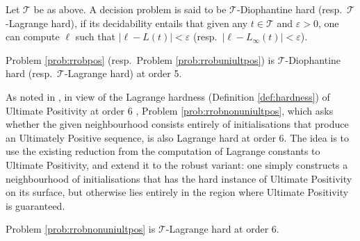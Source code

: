 \begin{definition}
\label{def:hardness}
Let $\mathcal{T}$ be as above. A decision problem is said to be $\mathcal{T}$-Diophantine hard (resp.\ $\mathcal{T}$-Lagrange hard), if its decidability entails that given any $t \in \mathcal{T}$ and $\varepsilon > 0$, one can compute $\ell$ such that $|\ell - L(t)| < \varepsilon$ (resp.\  $|\ell - L_\infty(t)| < \varepsilon$).
\end{definition}

\begin{theorem}
\label{thm:hardness}
Problem \ref{prob:rrobpos} (resp.\ Problem \ref{prob:rrobuniultpos}) is $\mathcal{T}$-Diophantine hard (resp.\ $\mathcal{T}$-Lagrange hard) at order 5. 
\end{theorem}

As noted in \cite{originalarxiv}, in view of the Lagrange hardness (Definition \ref{def:hardness}) of Ultimate Positivity at order 6 \cite{joeljames3}, Problem \ref{prob:rrobnonuniultpos}, which asks whether the given neighbourhood consists entirely of initialisations that produce an Ultimately Positive sequence, is also Lagrange hard at order 6. The idea is to use the existing reduction from the computation of Lagrange constants to Ultimate Positivity, and extend it to the robust variant: one simply constructs a neighbourhood of initialisations that has the hard instance of Ultimate Positivity on its surface, but otherwise lies entirely in the region where Ultimate Positivity is guaranteed.

\begin{theorem}
\label{thm:hardness2}
Problem \ref{prob:rrobnonuniultpos} is $\mathcal{T}$-Lagrange hard at order 6. 
\end{theorem}